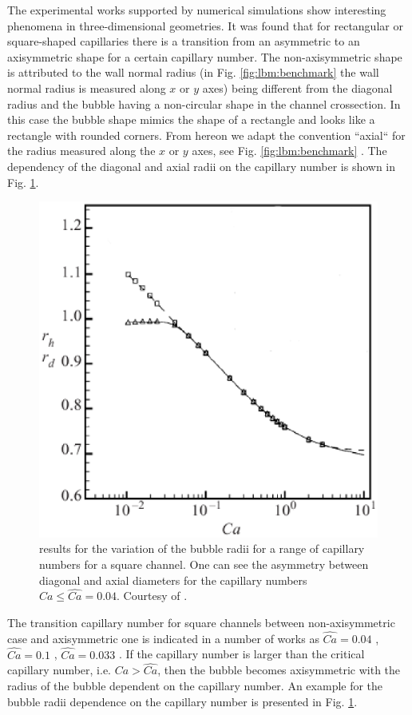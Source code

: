 \documentclass{article}
\begin{document}
The experimental works
\cite{shikazono-square,cerro-bubble-train} supported by numerical simulations \cite{heil-threedim,
wang-non-circular} show interesting phenomena in three-dimensional geometries. It was found
\cite{heil-threedim,wong-films} that for rectangular
or square-shaped capillaries there is a transition from an asymmetric to an axisymmetric shape for a
certain capillary number.
The non-axisymmetric shape is attributed to the wall normal radius (in Fig.
\ref{fig:lbm:benchmark} the wall normal radius is measured along $x$ or $y$ axes) being 
different from the
diagonal radius and the bubble having a non-circular shape in the channel crossection. In this case
the bubble shape mimics the shape of a rectangle and looks like a rectangle with rounded corners.
From hereon we adapt the convention ``axial`` for the radius measured along the $x$ or $y$ axes,
see Fig. \ref{fig:lbm:benchmark} \cite{heil-threedim}. The dependency
of the diagonal and axial radii on the capillary number is shown in Fig. 
\ref{fig:heil:three:dim}.
\begin{figure}[ht]
\includegraphics[width=\textwidth]{Figures/capillary_width_heil.eps}
\caption{\citet{heil-threedim} results for the variation of the bubble radii for a range of
capillary numbers for a square channel. One can see the asymmetry between diagonal and axial
diameters for the capillary
numbers $Ca\leq\widehat{Ca}=0.04$. Courtesy of \citet{heil-threedim}. \label{fig:heil:three:dim}}
\end{figure}
The transition capillary number for square channels between non-axisymmetric case and axisymmetric
one is indicated in a number of
works as $\widehat{Ca}=0.04$ \cite{cerro-bubble-train},
$\widehat{Ca}=0.1$
\cite{cerro-space,wang-non-circular}, $\widehat{Ca}=0.033$ \cite{heil-threedim}. If the capillary
number is larger
than
the critical capillary number, i.e. $Ca>\widehat{Ca}$, then the bubble becomes axisymmetric with the
radius of the bubble dependent on the capillary number. An example for the bubble radii
dependence on the capillary number is presented in Fig. \ref{fig:heil:three:dim}.
\end{document}
